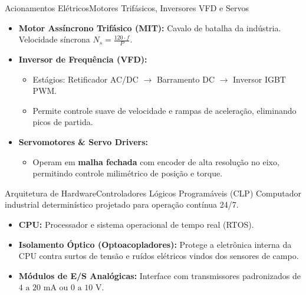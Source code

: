 \begin{senaiframe}{Acionamentos Elétricos}{Motores Trifásicos, Inversores VFD e Servos}
  \small
  \begin{itemize}
    \item \textbf{Motor Assíncrono Trifásico (MIT):} Cavalo de batalha da indústria. Velocidade síncrona $N_s = \frac{120 \cdot f}{P}$.
    \item \textbf{Inversor de Frequência (VFD):}
      \begin{itemize}
        \item Estágios: Retificador AC/DC $\rightarrow$ Barramento DC $\rightarrow$ Inversor IGBT PWM.
        \item Permite controle suave de velocidade e rampas de aceleração, eliminando picos de partida.
      \end{itemize}
    \item \textbf{Servomotores \& Servo Drivers:}
      \begin{itemize}
        \item Operam em \textbf{malha fechada} com encoder de alta resolução no eixo, permitindo controle milimétrico de posição e torque.
      \end{itemize}
  \end{itemize}
\end{senaiframe}

\begin{senaiframe}{Arquitetura de Hardware}{Controladores Lógicos Programáveis (CLP)}
  Computador industrial determinístico projetado para operação contínua 24/7.

  \vspace{4pt}
  \begin{itemize}
    \item \textbf{CPU:} Processador e sistema operacional de tempo real (RTOS).
    \item \textbf{Isolamento Óptico (Optoacopladores):} Protege a eletrônica interna da CPU contra surtos de tensão e ruídos elétricos vindos dos sensores de campo.
    \item \textbf{Módulos de E/S Analógicas:} Interface com transmissores padronizados de $4\text{ a }20\text{ mA}$ ou $0\text{ a }10\text{ V}$.
  \end{itemize}
\end{senaiframe}

